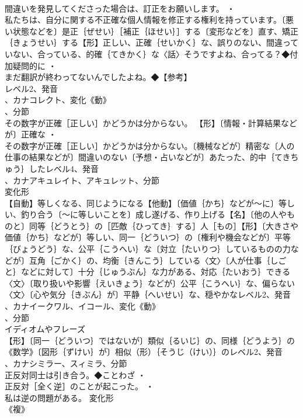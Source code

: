 \documentclass[8pt]{extreport}
\begin{document}
\begin{CJK}{UTF8}{min}
\\	間違いを発見してくださった場合は、訂正をお願いします。 ・
\\	私たちは、自分に関する不正確な個人情報を修正する権利を持っています。〔悪い状態などを〕是正｛ぜせい｝［補正｛ほせい｝］する〔変形などを〕直す、矯正｛きょうせい｝する【形】正しい、正確｛せいかく｝な、誤りのない、間違っていない、合っている、的確｛てきかく｝な〈話〉そうですよね、合ってる？◆付加疑問的に ・
\\	まだ翻訳が終わってないんでしたよね。◆【参考】
\\	レベル2、発音
\\	、カナコレクト、変化《動》
\\	、分節
\\	その数字が正確［正しい］かどうかは分からない。		【形】〔情報・計算結果などが〕正確な ・
\\	その数字が正確［正しい］かどうかは分からない。〔機械などが〕精密な〔人の仕事の結果などが〕間違いのない〔予想・占いなどが〕あたった、的中｛てきちゅう｝したレベル4、発音
\\	、カナアキュレイト、アキュレット、分節
\\	変化形 
\\	【自動】等しくなる、同じようになる【他動】〔価値｛かち｝などが～に〕等しい、釣り合う〔～に等しいことを〕成し遂げる、作り上げる【名】〔他の人やものと〕同等｛どうとう｝の［匹敵｛ひってき｝する］人［もの］【形】〔大きさや価値｛かち｝などが〕等しい、同一｛どういつ｝の〔権利や機会などが〕平等｛びょうどう｝な、公平｛こうへい｝な〔対立｛たいりつ｝しているものの力などが〕互角｛ごかく｝の、均衡｛きんこう｝している〈文〉〔人が仕事｛しごと｝などに対して〕十分｛じゅうぶん｝な力がある、対応｛たいおう｝できる〈文〉〔取り扱いや影響｛えいきょう｝などが〕公平｛こうへい｝な、偏らない〈文〉〔心や気分｛きぶん｝が〕平静｛へいせい｝な、穏やかなレベル2、発音
\\	、カナイークワル、イコール、変化《動》
\\	、分節
\\	イディオムやフレーズ 
\\	【形】〔同一｛どういつ｝ではないが〕類似｛るいじ｝の、同様｛どうよう｝の《数学》〔図形｛ずけい｝が〕相似（形）｛そうじ（けい）｝のレベル2、発音
\\	、カナシミラー、スィミラ、分節
\\	正反対同士は引き合う。◆ことわざ ・
\\	正反対［全く逆］のことが起こった。 ・
\\	私は逆の問題がある。	変化形 
\\	《複》

\end{CJK}
\end{document}
